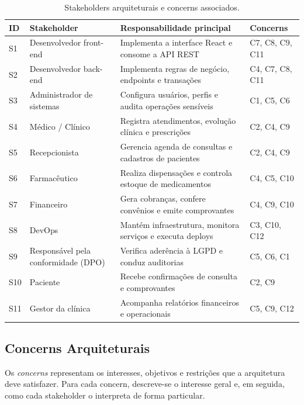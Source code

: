 \begin{table}[H]
\caption{Stakeholders arquiteturais e concerns associados.}
\label{tab:stakeholders-arquitetura}
\centering
\small
\begin{tabularx}{\textwidth}{|l|l|X|l|}
\hline
\textbf{ID} & \textbf{Stakeholder} & \textbf{Responsabilidade principal} & \textbf{Concerns} \\
\hline
S1  & Desenvolvedor front-end     & Implementa a interface React e consome a API REST & C7, C8, C9, C11 \\
\hline
S2  & Desenvolvedor back-end      & Implementa regras de negócio, endpoints e transações & C4, C7, C8, C11 \\
\hline
S3  & Administrador de sistemas   & Configura usuários, perfis e audita operações sensíveis & C1, C5, C6 \\
\hline
S4  & Médico / Clínico            & Registra atendimentos, evolução clínica e prescrições & C2, C4, C9 \\
\hline
S5  & Recepcionista               & Gerencia agenda de consultas e cadastros de pacientes & C2, C4, C9 \\
\hline
S6  & Farmacêutico                & Realiza dispensações e controla estoque de medicamentos & C4, C5, C10 \\
\hline
S7  & Financeiro                  & Gera cobranças, confere convênios e emite comprovantes & C4, C9, C10 \\
\hline
S8  & DevOps     & Mantém infraestrutura, monitora serviços e executa deploys & C3, C10, C12 \\
\hline
S9  & Responsável pela conformidade (DPO) & Verifica aderência à LGPD e conduz auditorias & C5, C6, C1 \\
\hline
S10 & Paciente                    & Recebe confirmações de consulta e comprovantes & C2, C9 \\
\hline
S11 & Gestor da clínica           & Acompanha relatórios financeiros e operacionais & C5, C9, C12 \\
\hline
\end{tabularx}
\end{table}
 
\subsection{Concerns Arquiteturais}
 
Os \textit{concerns} representam os interesses, objetivos e restrições que a
arquitetura deve satisfazer. Para cada concern, descreve-se o interesse geral e,
em seguida, como cada stakeholder o interpreta de forma particular.
 
